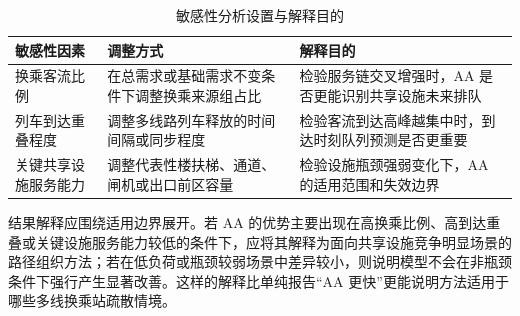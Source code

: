 \documentclass[UTF8,a4paper,12pt]{ctexart}
\begin{document}
\begin{table}[htbp]
\centering
\caption{敏感性分析设置与解释目的}
\small
\begin{tabular}{p{}p{}p{}}
\toprule
敏感性因素 & 调整方式 & 解释目的 \\
\midrule
换乘客流比例 & 在总需求或基础需求不变条件下调整换乘来源组占比 & 检验服务链交叉增强时，AA 是否更能识别共享设施未来排队 \\
列车到达重叠程度 & 调整多线路列车释放的时间间隔或同步程度 & 检验客流到达高峰越集中时，到达时刻队列预测是否更重要 \\
关键共享设施服务能力 & 调整代表性楼扶梯、通道、闸机或出口前区容量 & 检验设施瓶颈强弱变化下，AA 的适用范围和失效边界 \\
\bottomrule
\end{tabular}
\end{table}

结果解释应围绕适用边界展开。若 AA 的优势主要出现在高换乘比例、高到达重叠或关键设施服务能力较低的条件下，应将其解释为面向共享设施竞争明显场景的路径组织方法；若在低负荷或瓶颈较弱场景中差异较小，则说明模型不会在非瓶颈条件下强行产生显著改善。这样的解释比单纯报告“AA 更快”更能说明方法适用于哪些多线换乘站疏散情境。
\end{document}
